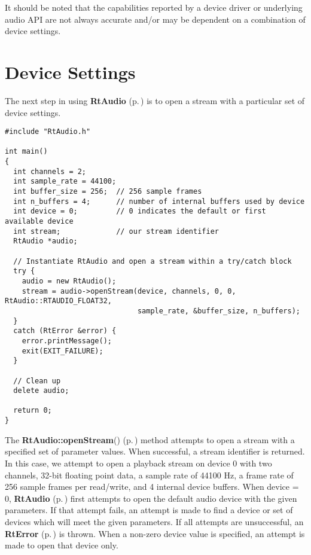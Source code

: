 It should be noted that the capabilities reported by a device driver or underlying audio API are not always accurate and/or may be dependent on a combination of device settings.

\section{Device Settings}\label{settings}


The next step in using {\bf Rt\-Audio} {\rm (p.\,\pageref{classRtAudio})} is to open a stream with a particular set of device settings.

\footnotesize\begin{verbatim}#include "RtAudio.h"

int main()
{
  int channels = 2;
  int sample_rate = 44100;
  int buffer_size = 256;  // 256 sample frames
  int n_buffers = 4;      // number of internal buffers used by device
  int device = 0;         // 0 indicates the default or first available device
  int stream;             // our stream identifier
  RtAudio *audio;

  // Instantiate RtAudio and open a stream within a try/catch block
  try {
    audio = new RtAudio();
    stream = audio->openStream(device, channels, 0, 0, RtAudio::RTAUDIO_FLOAT32,
                               sample_rate, &buffer_size, n_buffers);
  }
  catch (RtError &error) {
    error.printMessage();
    exit(EXIT_FAILURE);
  }

  // Clean up
  delete audio;

  return 0;
}\end{verbatim}\normalsize 


The {\bf Rt\-Audio::open\-Stream}() {\rm (p.\,\pageref{classRtAudio_a3})} method attempts to open a stream with a specified set of parameter values. When successful, a stream identifier is returned. In this case, we attempt to open a playback stream on device 0 with two channels, 32-bit floating point data, a sample rate of 44100 Hz, a frame rate of 256 sample frames per read/write, and 4 internal device buffers. When device = 0, {\bf Rt\-Audio} {\rm (p.\,\pageref{classRtAudio})} first attempts to open the default audio device with the given parameters. If that attempt fails, an attempt is made to find a device or set of devices which will meet the given parameters. If all attempts are unsuccessful, an {\bf Rt\-Error} {\rm (p.\,\pageref{classRtError})} is thrown. When a non-zero device value is specified, an attempt is made to open that device only.

